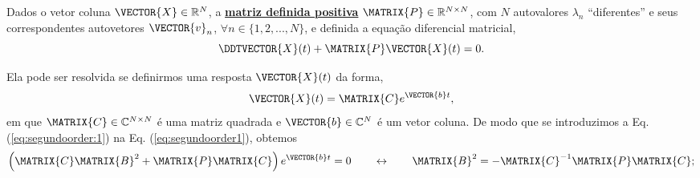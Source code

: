 \begin{myproofT}\label{proof:theo:differential-eq:0}
Dados o vetor coluna $\VECTOR{X} \in \mathbb{R}^N$, 
a \hyperref[def:positivematrix0]{\textbf{matriz definida positiva}} $\MATRIX{P} \in \mathbb{R}^{N\times N}$,
com $N$ autovalores $\lambda_n$ ``diferentes'' e seus correspondentes autovetores $\VECTOR{v}_n$,
$\forall n \in \{1, 2, ..., N\}$, 
e definida a equação diferencial matricial,
\begin{equation}\label{eq:segundoorder1}
\DDTVECTOR{X}(t) + \MATRIX{P} \VECTOR{X}(t)=0.
\end{equation}

Ela pode ser resolvida se definirmos uma resposta $\VECTOR{X}(t)$ da forma, 
\begin{equation}\label{eq:segundoorder:1}
\VECTOR{X}(t)=\MATRIX{C}e^{\VECTOR{b}t},
\end{equation}
em que $\MATRIX{C} \in \mathbb{C}^{N\times N}$ é uma matriz quadrada e $\VECTOR{b} \in \mathbb{C}^{N}$ é um vetor coluna.
De modo que se introduzimos a Eq. (\ref{eq:segundoorder:1}) na Eq. (\ref{eq:segundoorder1}),
obtemos 
\begin{equation}\label{eq:segundoorder:2}
\left(\MATRIX{C}\MATRIX{B}^2+\MATRIX{P}\MATRIX{C}\right)e^{\VECTOR{b}t} = 0 
\qquad \leftrightarrow \qquad
\MATRIX{B}^2=-\MATRIX{C}^{-1}\MATRIX{P}\MATRIX{C};
\end{equation}


\end{myproofT}
